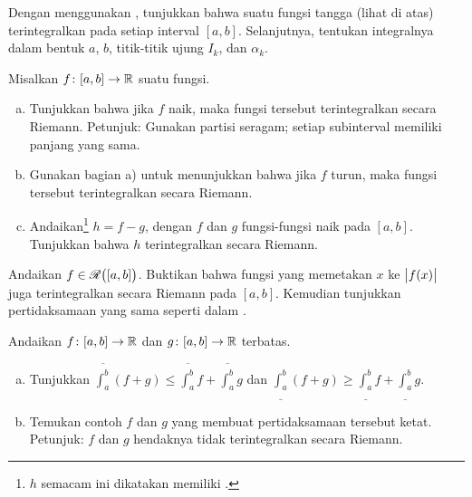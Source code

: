 \begin{exercise}
Dengan menggunakan , tunjukkan bahwa suatu fungsi
tangga (lihat di atas) terintegralkan
pada setiap interval $[a,b]$.  Selanjutnya, tentukan integralnya dalam bentuk
$a$, $b$, titik-titik ujung $I_k$, dan $\alpha_k$.
\end{exercise}

\begin{exercise}
\label{exercise:boundedvariationintegrable}
Misalkan $f \colon [a,b] \to {\mathbb{R}}$ suatu fungsi.
\begin{enumerate}[a)]
\item
Tunjukkan bahwa jika $f$ naik, maka fungsi tersebut terintegralkan secara
Riemann.  Petunjuk: Gunakan partisi seragam; setiap subinterval memiliki panjang yang sama.
\item
Gunakan bagian a) untuk menunjukkan bahwa jika $f$ turun, maka fungsi tersebut terintegralkan secara
Riemann.
\item
Andaikan\footnote{$h$ semacam ini dikatakan memiliki \emph{}.}
$h = f-g$, dengan $f$ dan $g$ fungsi-fungsi naik
pada $[a,b]$.  Tunjukkan bahwa $h$ terintegralkan secara Riemann.
\end{enumerate}
\end{exercise}

\begin{exercise}[Menantang] \label{exercise:hardabsint}
Andaikan $f \in {\mathscr{R}}\bigl([a,b]\bigr)$.  Buktikan bahwa fungsi yang memetakan $x$ ke
$\bigl\lvert {f(x)} \bigr\rvert$ juga terintegralkan secara Riemann pada $[a,b]$.
Kemudian tunjukkan pertidaksamaan yang sama seperti dalam .
\end{exercise}

\begin{exercise}  \label{exercise:upperlowerlinineq}
Andaikan $f \colon [a,b] \to {\mathbb{R}}$ dan $g \colon [a,b] \to {\mathbb{R}}$
terbatas.
\begin{enumerate}[a)]
\item
Tunjukkan
$\overline{\int_a^b} (f+g) \leq \overline{\int_a^b}f+\overline{\int_a^b}g$ dan
$\underline{\int_a^b} (f+g) \geq
\underline{\int_a^b}f+\underline{\int_a^b}g$.
\item
Temukan contoh $f$ dan $g$ yang membuat
pertidaksamaan tersebut ketat.  Petunjuk: $f$ dan $g$ hendaknya tidak terintegralkan secara
Riemann.
\end{enumerate}
\end{exercise}

